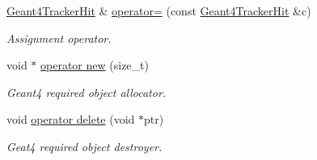 \begin{DoxyCompactItemize}
\hyperlink{class_d_d4hep_1_1_simulation_1_1_geant4_tracker_hit}{Geant4TrackerHit} \& \hyperlink{class_d_d4hep_1_1_simulation_1_1_geant4_tracker_hit_aab16478430961e4ac76d82d15f07af58}{operator=} (const \hyperlink{class_d_d4hep_1_1_simulation_1_1_geant4_tracker_hit}{Geant4TrackerHit} \&c)
\begin{DoxyCompactList}\small\item\em Assignment operator. \item\end{DoxyCompactList}\item 
void $\ast$ \hyperlink{class_d_d4hep_1_1_simulation_1_1_geant4_tracker_hit_a66a40ac322757dd8e5398a28dbd04334}{operator new} (size\_\-t)
\begin{DoxyCompactList}\small\item\em Geant4 required object allocator. \item\end{DoxyCompactList}\item 
void \hyperlink{class_d_d4hep_1_1_simulation_1_1_geant4_tracker_hit_a40caf2e6d8ebdf643bd26f27aff917b0}{operator delete} (void $\ast$ptr)
\begin{DoxyCompactList}\small\item\em Geat4 required object destroyer. \item\end{DoxyCompactList}\end{DoxyCompactItemize}
